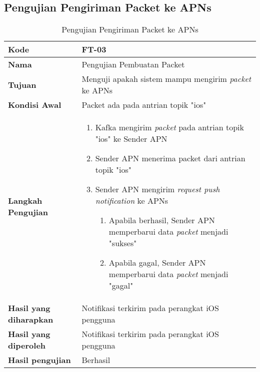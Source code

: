 \subsection{Pengujian Pengiriman Packet ke APNs}
\begin{longtable}{|p{2.5cm}|p{6.5cm}|}
	\caption{Pengujian Pengiriman Packet ke APNs} \label{t:uji_pengiriman_packet_apn} \\ \hline
	\textbf{Kode} & FT-03 \\ \hline
	\textbf{Nama} & Pengujian Pembuatan Packet \\ \hline
	\textbf{Tujuan} & Menguji apakah sistem mampu mengirim \textit{packet} ke APNs \\ \hline
	\textbf{Kondisi Awal} &  Packet ada pada antrian topik "ios"\\ \hline
	\textbf{Langkah Pengujian} &  
	\begin{enumerate}
		\item Kafka mengirim \textit{packet} pada antrian topik "ios" ke Sender APN
		\item Sender APN menerima packet dari antrian topik "ios"
		\item Sender APN mengirim \textit{request push notification} ke APNs
		\begin{enumerate}
			\item Apabila berhasil, Sender APN memperbarui data \textit{packet} menjadi "sukses"
			\item Apabila gagal, Sender APN memperbarui data \textit{packet} menjadi "gagal"
		\end{enumerate}
	\end{enumerate} \\ \hline
	\textbf{Hasil yang diharapkan} & Notifikasi terkirim pada perangkat iOS pengguna \\ \hline
	\textbf{Hasil yang diperoleh} & Notifikasi terkirim pada perangkat iOS pengguna \\ \hline
	\textbf{Hasil pengujian} & Berhasil \\ \hline
\end{longtable}

